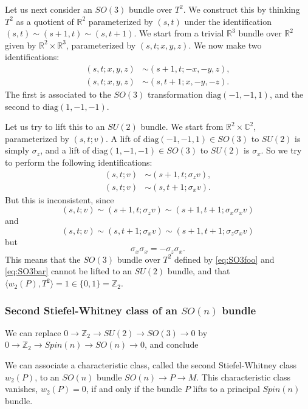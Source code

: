 \documentclass[12pt]{article}
\numberwithin{equation}{section}
\theoremstyle{remark}
\def\bC{\mathbb{C}}
\def\bR{\mathbb{R}}
\def\bZ{\mathbb{Z}}
\begin{document}
Let us next consider an $SO(3)$ bundle over $T^2$.
We construct this by thinking $T^2$ as a quotient of $\bR^2$ parameterized by $(s,t)$ under the identification $(s,t)\sim (s+1,t)\sim (s,t+1)$.
We start from a trivial $\bR^3$ bundle over $\bR^2$ given by
$\bR^2\times \bR^3$, parameterized by $(s,t;x,y,z)$.
We now make two identifications:
\begin{align}
  (s,t;x,y,z) &\sim (s+1,t;-x,-y,z),\label{eq:SO3foo}\\
  (s,t;x,y,z) &\sim (s,t+1;x,-y,-z).\label{eq:SO3bar}
\end{align}
The first is associated to the $SO(3)$ transformation $\mathrm{diag}(-1,-1,1)$,
and the second to $\mathrm{diag}(1,-1,-1)$.

Let us try to lift this to an $SU(2)$ bundle. 
We start from $\bR^2\times \bC^2$, parameterized by $(s,t;v)$.
A lift of $\mathrm{diag}(-1,-1,1)\in SO(3)$ to $SU(2)$ is simply $\sigma_z$,
and a lift of $\mathrm{diag}(1,-1,-1)\in SO(3)$ to $SU(2)$ is $\sigma_x$.
So we try to perform the following identifications:
\begin{align}
  (s,t;v) &\sim (s+1,t;\sigma_z v),\\
  (s,t;v) &\sim (s,t+1;\sigma_x v).
\end{align}
But this is inconsistent, since \begin{equation}
  (s,t;v)\sim (s+1,t;\sigma_z v)\sim (s+1,t+1;\sigma_x\sigma_x v)
\end{equation} and \begin{equation}
  (s,t;v)\sim (s,t+1;\sigma_x v)\sim (s+1,t+1;\sigma_z\sigma_x v)
\end{equation} but \begin{equation}
  \sigma_x\sigma_x = - \sigma_z\sigma_x.
\end{equation}
This means that the $SO(3)$ bundle over $T^2$ defined by \eqref{eq:SO3foo} and \eqref{eq:SO3bar} cannot be lifted to an $SU(2)$ bundle,
and that $\langle w_2(P),T^2\rangle=1 \in \{0,1\}=\bZ_2$.

\subsubsection{Second Stiefel-Whitney class of an $SO(n)$ bundle}


We can replace $0\to \bZ_2\to SU(2)\to SO(3)\to 0$ by $0\to \bZ_2\to Spin(n)\to SO(n)\to 0$, and conclude 
\begin{proposition}
  We can associate a characteristic class, called
  the second Stiefel-Whitney class $w_2(P)$,
  to an $SO(n)$ bundle $SO(n)\to P\to M$.
  This characteristic class vanishes, $w_2(P)=0$, if and only if the bundle $P$ lifts to a principal $Spin(n)$ bundle.
\end{proposition}
\end{document}
